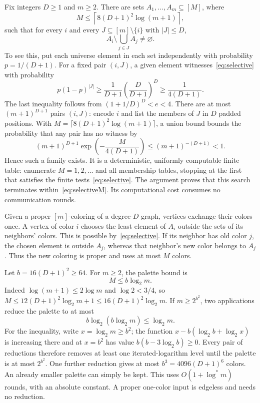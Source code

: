 \documentclass[11pt]{article}
\theoremstyle{definition}\newtheorem{definition}[theorem]{Definition}
\theoremstyle{remark}\newtheorem{remark}[theorem]{Remark}
\newcommand{\ls}{\log^*}
\begin{document}
Fix integers $D\ge1$ and $m\ge2$. There are sets
$A_1,\ldots,A_m\subseteq[M]$, where
\begin{equation}\label{eq:selectiveM}
                     M\le\left\lceil8(D+1)^2\log(m+1)\right\rceil,
\end{equation}
such that for every $i$ and every
$J\subseteq[m]\setminus\{i\}$ with $|J|\le D$,
\begin{equation}\label{eq:selective}
                         A_i\setminus\bigcup_{j\in J}A_j\ne\varnothing.
\end{equation}
To see this, put each universe element in each set independently
with probability $p=1/(D+1)$. For a fixed pair $(i,J)$, a given
element witnesses~\eqref{eq:selective} with probability
\[
 p(1-p)^{|J|}\ge\frac{1}{D+1}\left(\frac D{D+1}\right)^D
                       \ge\frac1{4(D+1)}.
\]
The last inequality follows from $(1+1/D)^D<e<4$.
There are at most $(m+1)^{D+1}$ pairs $(i,J)$: encode $i$
and list the members of $J$ in $D$ padded positions.
With $M=\lceil8(D+1)^2\log(m+1)\rceil$, a union bound bounds
the probability that any pair has no witness by
\[
 (m+1)^{D+1}\exp\left(-\frac{M}{4(D+1)}\right)
                     \le(m+1)^{-(D+1)}<1.
\]
Hence such a family exists. It is a deterministic, uniformly
computable finite table: enumerate $M=1,2,\ldots$ and all
membership tables, stopping at the first that satisfies the
finite tests~\eqref{eq:selective}. The argument proves that
this search terminates within~\eqref{eq:selectiveM}. Its
computational cost consumes no communication rounds.

Given a proper $[m]$-coloring of a degree-$D$ graph, vertices
exchange their colors once. A vertex of color $i$ chooses
the least element of $A_i$ outside the sets of its neighbors'
colors. This is possible by~\eqref{eq:selective}. If its
neighbor has old color $j$, the chosen element is outside
$A_j$, whereas that neighbor's new color belongs to $A_j$.
Thus the new coloring is proper and uses at most $M$ colors.

Let $b=16(D+1)^2\ge64$. For $m\ge2$, the palette bound is
\[
                              M\le b\log_2m.
\]
Indeed $\log(m+1)\le2\log m$ and $\log2<3/4$, so
$M\le12(D+1)^2\log_2m+1\le16(D+1)^2\log_2m$. If
$m\ge2^{b^2}$, two applications reduce the palette to at most
\[
 b\log_2(b\log_2m)\le\log_2m.
\]
For the inequality, write $x=\log_2m\ge b^2$; the function
$x-b(\log_2b+\log_2x)$ is increasing there and at $x=b^2$
has value $b(b-3\log_2b)\ge0$. Every pair of reductions
therefore removes at least one iterated-logarithm level until
the palette is at most $2^{b^2}$. One further reduction gives
at most $b^3=4096(D+1)^6$ colors. An already smaller palette
can simply be kept. This uses $O(1+\ls m)$ rounds, with an
absolute constant. A proper one-color input is edgeless
and needs no reduction.
\end{document}
